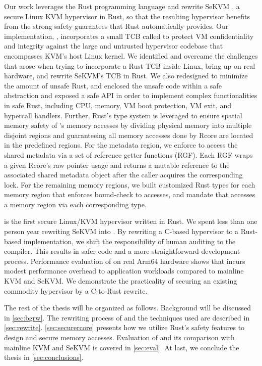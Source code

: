 Our work leverages the Rust programming language and rewrite SeKVM \cite{sekvm},
a secure Linux KVM hypervisor in Rust, so that the resulting hypervisor
benefits from the strong safety guarantees that Rust automatically provides.
Our implementation, \rustsec{}, incorporates a small TCB called \rustcore{} to
protect VM confidentiality and integrity against the large and untrusted
hypervisor codebase that encompasses KVM’s host Linux kernel.
We identified and overcame the challenges that arose when trying to
incorporate a Rust TCB inside Linux, bring up \rustsec{} on real hardware, and
rewrite SeKVM's TCB in Rust.
We also redesigned \rustcore{} to minimize the amount of unsafe Rust,
and enclosed the unsafe code within a safe abstraction and exposed a safe API
in order to implement complex functionalities in safe Rust, including CPU,
memory, VM boot protection, VM exit, and hypercall handlers.
Further, Rust’s type system is leveraged to ensure spatial memory safety of
\rustcore{}’s memory accesses by dividing physical memory into multiple
disjoint regions and guaranteeing all memory accesses done by Rcore are located
in the predefined regions.
For the \rustcore{} metadata region, we enforce \rustcore{} to access the
shared metadata via a set of reference getter functions (RGF).
Each RGF wraps a given Rcore’s raw pointer usage and returns a mutable
reference to the associated shared metadata object after the caller acquires
the corresponding lock.
For the remaining memory regions, we built
customized Rust types for each memory region that
enforces bound-check to accesses, and mandate that \rustcore{} accesses a
memory region via each corresponding type.

\rustsec{} is the first secure Linux/KVM hypervisor written in Rust.
We spent less than one person year rewriting SeKVM into \rustsec{}.
By rewriting a C-based hypervisor to a Rust-based implementation,
we shift the responsibility of human auditing to the compiler.
This results in safer code and a more straightforward development process.
Performance evaluation of \rustsec{} on real Arm64 hardware shows that
\rustsec{} incurs modest performance overhead to application workloads
compared to mainline KVM and SeKVM. We demonstrate the practicality of
securing an existing commodity hypervisor by a C-to-Rust rewrite.

The rest of the thesis will be organized as follows. Background
will be discussed in \autoref{sec:bgrw}. The rewriting process of \rustsec{}
and the techniques used are described in \autoref{sec:rewrite}.
\autoref{sec:securercore} presents how we utilize Rust's safety features to
design and secure \rustcore{} memory accesses.
Evaluation of \rustsec{} and its comparison with mainline KVM and SeKVM is
covered in \autoref{sec:eval}. At last, we conclude the thesis in
\autoref{sec:conclusions}.
